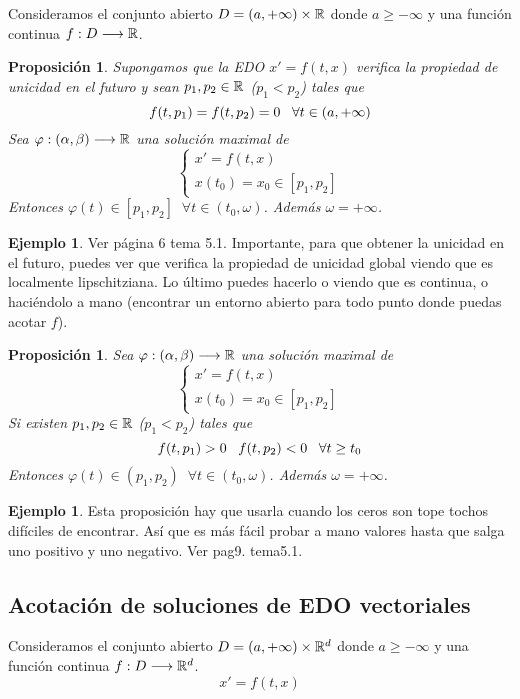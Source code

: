 \documentclass[12pt]{article}
\newtheorem{prop}[theorem]{Proposición}
\theoremstyle{definition}
\newtheorem{example}[theorem]{Ejemplo}
\theoremstyle{remark}
\begin{document}
Consideramos el conjunto abierto $D=(a,+\infty)\times\mathbb{R}$ donde $a\geq -\infty$ y una función continua $f : D \longrightarrow \mathbb{R}$.

\begin{prop}
Supongamos que la EDO $x'=f(t,x)$ verifica la propiedad de unicidad en el futuro y sean $p_1,p_2\in\mathbb{R}$ ($p_1<p_2$) tales que 
\[
f(t,p_1)=f(t,p_2)=0 \;\;\; \forall t\in(a,+\infty)
\]
Sea $\varphi : (\alpha,\beta) \longrightarrow \mathbb{R}$ una solución maximal de
\[
\left\{
\begin{array}{l}
x'=f(t,x)\\
x(t_0)=x_0\in[p_1,p_2]
\end{array}
\right.
\]
Entonces $\varphi(t)\in[p_1,p_2] \;\; \forall t\in(t_0,\omega)$. Además $\omega=+\infty$.
\end{prop}

\begin{example}
Ver página 6 tema 5.1. Importante, para que obtener la unicidad en el futuro, puedes ver que verifica la propiedad  de unicidad global viendo que es localmente lipschitziana. Lo último puedes hacerlo o viendo que es continua, o haciéndolo a mano (encontrar un entorno abierto para todo punto donde puedas acotar $f$).
\end{example}

\begin{prop}
Sea $\varphi : (\alpha,\beta) \longrightarrow \mathbb{R}$ una solución maximal de
\[
\left\{
\begin{array}{l}
x'=f(t,x)\\
x(t_0)=x_0\in[p_1,p_2]
\end{array}
\right.
\]
Si existen $p_1,p_2\in\mathbb{R}$ ($p_1<p_2$) tales que 
\[
f(t,p_1)>0 \;\;\; f(t,p_2)<0 \;\;\; \forall t\geq t_0
\]
Entonces $\varphi(t)\in(p_1,p_2) \;\; \forall t\in(t_0,\omega)$. Además $\omega=+\infty$.
\end{prop}
\begin{example}
Esta proposición hay que usarla cuando los ceros son tope tochos difíciles de encontrar. Así que es más fácil probar a mano valores hasta que salga uno positivo y uno negativo. Ver pag9. tema5.1.
\end{example}

\subsection{Acotación de soluciones de EDO vectoriales}

Consideramos el conjunto abierto $D=(a,+\infty)\times\mathbb{R}^d$ donde $a\geq -\infty$ y una función continua $f : D \longrightarrow \mathbb{R}^d$.
\begin{equation}
x'=f(t,x) \tag{*}
\end{equation}
\end{document}
